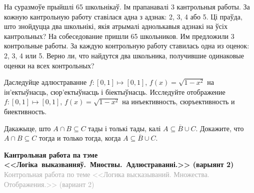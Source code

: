 \begin{problemList}
\problemItemSimple
{На суразмоўе прыйшлі 65 школьнікаў. Ім прапанавалі 3 кантрольныя работы. За кожную кантрольную работу ставілася адна з адзнак: 2, 3, 4 або 5. Ці праўда, што знойдуцца два школьнікі, якія атрымалі аднолькавыя адзнакі на ўсіх кантрольных?}
{На собеседование пришли 65 школьников. Им предложили 3 контрольные работы. За каждую контрольную работу ставилась одна из оценок: 2, 3, 4 или 5. Верно ли, что найдутся два школьника, получившие одинаковые оценки на всех контрольных?}

\problemItemSimple
{Даследуйце адлюстраванне $f: [0, 1] \mapsto [0, 1]$, $f(x) = \sqrt{1 - x^2}$ на ін'ектыўнасць, сюр'ектыўнасць і біектыўнасць.}
{Исследуйте отображение $f: [0, 1] \mapsto [0, 1]$, $f(x) = \sqrt{1 - x^2}$ на инъективность, сюръективность и биективность.}

\problemItemSimple
{Дакажыце, што $A \cap B \subseteq C$ тады і толькі тады, калі $A \subseteq \overline{B} \cup C$.}
{Докажите, что $A \cap B \subseteq C$ тогда и только тогда, когда $A \subseteq \overline{B} \cup C$.}

\end{problemList}

\newpage 

\begin{center}
	\textbf{Кантрольная работа па тэме <<Логіка~выказванняў.~Мноствы.~Адлюстраванні.>> (варыянт 2)} \\
	{\small \textcolor{darkgray}{Контрольная работа по теме <<Логика высказываний. Множества. Отображения.>> (вариант 2)}}
\end{center}

